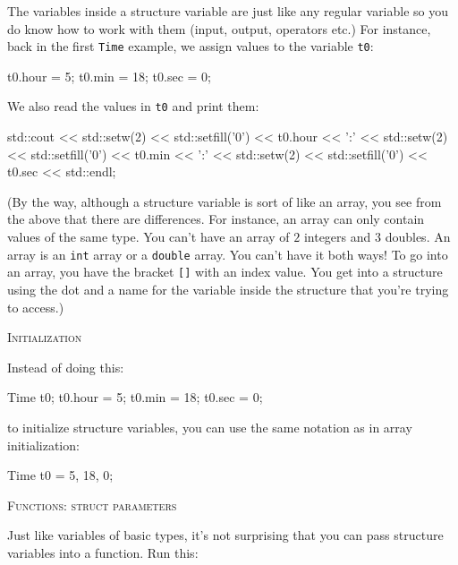 The variables inside a structure variable are just like any regular variable so
you do know how to work with them (input, output, operators etc.) For instance,
back in the first \verb!Time! example, we assign values to the variable
\verb!t0!:
\begin{console}
t0.hour = 5;
t0.min = 18;
t0.sec = 0;
\end{console}

We also read the values in \verb!t0! and print them:
\begin{console}
std::cout << std::setw(2) << std::setfill('0') << t0.hour
          << ':'
          << std::setw(2) << std::setfill('0') << t0.min
          << ':'
          << std::setw(2) << std::setfill('0') << t0.sec
          << std::endl;
\end{console}

(By the way, although a structure variable is sort of like an array, you see
from the above that there are differences. For instance, an array can only
contain values of the same type. You can't have an array of $2$ integers and
$3$ doubles. An array is an \verb!int! array or a \verb!double! array. You
can't have it both ways! To go into an array, you have the bracket \verb![]!
with an index value. You get into a structure using the dot and a name for the
variable inside the structure that you're trying to access.)

\textsc{Initialization}

Instead of doing this:
\begin{console}
Time t0;
t0.hour = 5;
t0.min = 18;
t0.sec = 0;
\end{console}
to initialize structure variables, you can use the same notation as in array
initialization:
\begin{console}
Time t0 = {5, 18, 0};
\end{console}




\textsc{Functions: struct parameters}

Just like variables of basic types, it's not surprising that you can pass
structure variables into a function. Run this:

